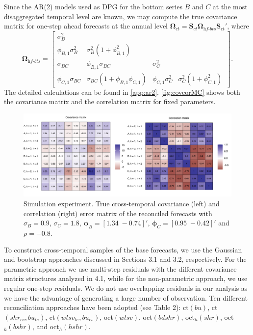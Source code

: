 \documentclass[a4paper,11pt]{article}
\newcommand{\Svet}{\bm{S}}
\newcommand{\Omegavet}{\bm{\Omega}}
\newcommand{\phivet}{\bm{\phi}}
\theoremstyle{definition}
\begin{document}
Since the AR(2) models used as DPG for the bottom series $B$ and $C$ at the most disaggregated temporal level are known, we may compute the true covariance matrix for one-step ahead forecasts at the annual level $\Omegavet_{ct} = \Svet_{ct}\Omegavet_{\textit{hf-bts}}\Svet_{ct}'$, where
$$
	\Omegavet_{\textit{hf-bts}} = \begin{bmatrix}
		\sigma^2_B            &                                                 &                      &                                        \\
		\phi_{B,1}\sigma_B^2  & \sigma_B^2\left(1+\phi_{B,1}^2\right)           &                      &                                        \\
		\sigma_{BC}           & \phi_{B,1}\sigma_{BC}                           & \sigma_C^2           &                                        \\
		\phi_{C,1}\sigma_{BC} & \sigma_{BC}\left(1+\phi_{B,1}\phi_{C,1} \right) & \phi_{C,1}\sigma_C^2 & \sigma_C^2\left(1+\phi_{C,1}^2\right)\
	\end{bmatrix}.
$$
The detailed calculations can be found in \autoref{app:ar2}.
\autoref{fig:covcorMC} shows both the covariance matrix and the correlation matrix for fixed parameters.

\begin{figure}[!t]
	\centering
	\includegraphics[width = \linewidth]{fig/AR/covcor.pdf}
	\caption{Simulation experiment. True cross-temporal covariance (left) and correlation (right) error matrix of the reconciled forecasts with $\sigma_B = 0.9$, $\sigma_C = 1.8$, $\phivet_B = [1.34\; -0.74]'$, $\phivet_C = [0.95\; -0.42]'$ and $\rho = -0.8$.}
	\label{fig:covcorMC}
\end{figure}

To construct cross-temporal samples of the base forecasts, we use the Gaussian and bootstrap approaches discussed in Sections 3.1 and 3.2, respectively. For the parametric approach we use multi-step residuals with the different covariance matrix structures analyzed in 4.1, while for the non-parametric approach, we use regular one-step residuals. We do not use overlapping residuals in our analysis as we have the advantage of generating a large number of observation. Ten different reconciliation approaches have been adopted (see Table 2): ct$(bu)$, ct$(shr_{cs}, bu_{te})$, ct$(wlsv_{te}, bu_{cs})$, oct$(wlsv)$, oct$(bdshr)$, oct$_h(shr)$, oct$_h(bshr)$, and oct$_h(hshr)$.
\end{document}
